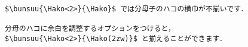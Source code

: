 \begin{verbatim}
$\bunsuu{\Hako<2>}{\Hako}$ では分母子のハコの横巾が不揃いです．

分母のハコに余白を調整するオプションをつけると，
$\bunsuu{\Hako<2>}{\Hako(2zw)}$ と揃えることができます．
\end{verbatim}
